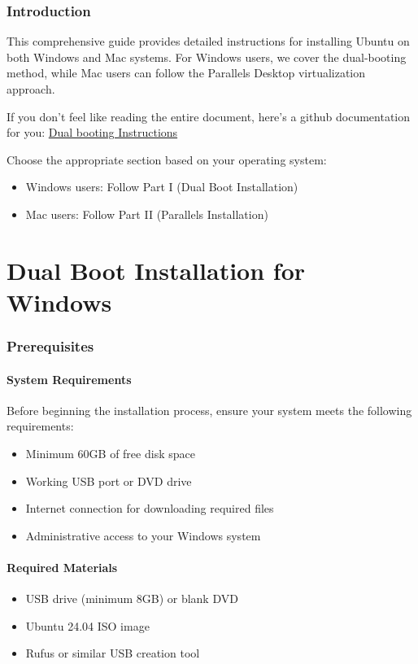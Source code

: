 \documentclass[11pt,a4paper]{article}
\newenvironment{note}
{\begin{tcolorbox}[colback=notecolor!10,colframe=notecolor,title=\textbf{Note}]}
{\end{tcolorbox}}
\begin{document}
\section{Introduction}
This comprehensive guide provides detailed instructions for installing Ubuntu on both Windows and Mac systems. For Windows users, we cover the dual-booting method, while Mac users can follow the Parallels Desktop virtualization approach. 
\begin{tcolorbox}[colback=yellow!10,colframe=orange!50!white,title=\textbf{TL;DR}]
If you don't feel like reading the entire document, here's a github documentation for you: \href{https://github.com/Dikshuy/dual-boot-Mac-Windows/tree/main}{Dual booting Instructions} 
\end{tcolorbox}

\begin{note}
Choose the appropriate section based on your operating system:
\begin{itemize}
    \item Windows users: Follow Part I (Dual Boot Installation)
    \item Mac users: Follow Part II (Parallels Installation)
\end{itemize}
\end{note}


\part{Dual Boot Installation for Windows}

\section{Prerequisites}
\subsection{System Requirements}
Before beginning the installation process, ensure your system meets the following requirements:
\begin{itemize}
    \item Minimum 60GB of free disk space
    \item Working USB port or DVD drive
    \item Internet connection for downloading required files
    \item Administrative access to your Windows system
\end{itemize}

\subsection{Required Materials}
\begin{itemize}
    \item USB drive (minimum 8GB) or blank DVD
    \item Ubuntu 24.04 ISO image
    \item Rufus or similar USB creation tool
\end{itemize}
\end{document}

